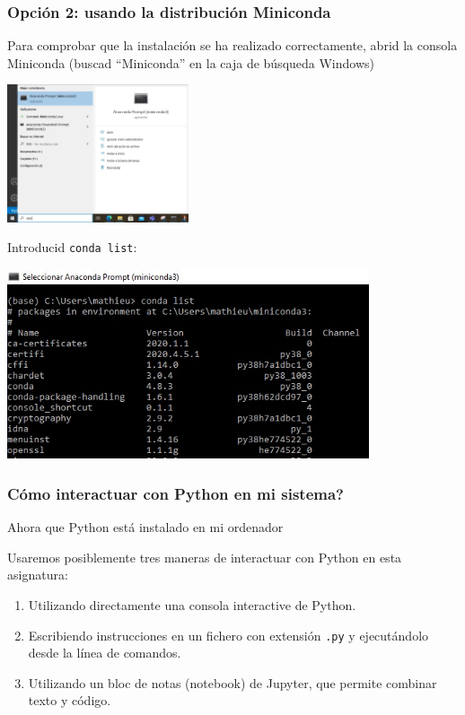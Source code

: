 \documentclass[9pt]{beamer}
\newcommand{\inlinecode}[2][Python]{\lstinline[language=#1, basicstyle=\color{mycodecolor}]{#2}}
\begin{document}
        \begin{frame}
            \frametitle{Opción 2: usando la distribución  Miniconda}
            Para comprobar que la instalación se ha realizado
            correctamente, abrid la consola Miniconda (buscad
            ``Miniconda'' en la caja de búsqueda Windows)
            \begin{center}
              \includegraphics[width=0.4\textwidth]{Miniconda_prompt.jpg}
            \end{center}

            Introducid \inlinecode[bash]{conda list}:
            \begin{center}
              \includegraphics[width=0.8\textwidth]{conda_list}
            \end{center}
            
          \end{frame}


          \begin{frame}
            \frametitle{Cómo interactuar con Python en mi sistema?}
            Ahora que Python está instalado en mi ordenador
            \begin{block}{Usaremos posiblemente tres maneras de
                interactuar con Python en esta asignatura:}
              \begin{enumerate}
              \item Utilizando directamente una consola interactive de
                Python.
              \item Escribiendo instrucciones en un fichero con
                extensión                {\tt .py} y ejecutándolo desde
                la línea de comandos.
              \item Utilizando un bloc de notas (notebook) de Jupyter, que permite combinar texto y código.
              \end{enumerate}
            \end{block}              
          \end{frame}
\end{document}
